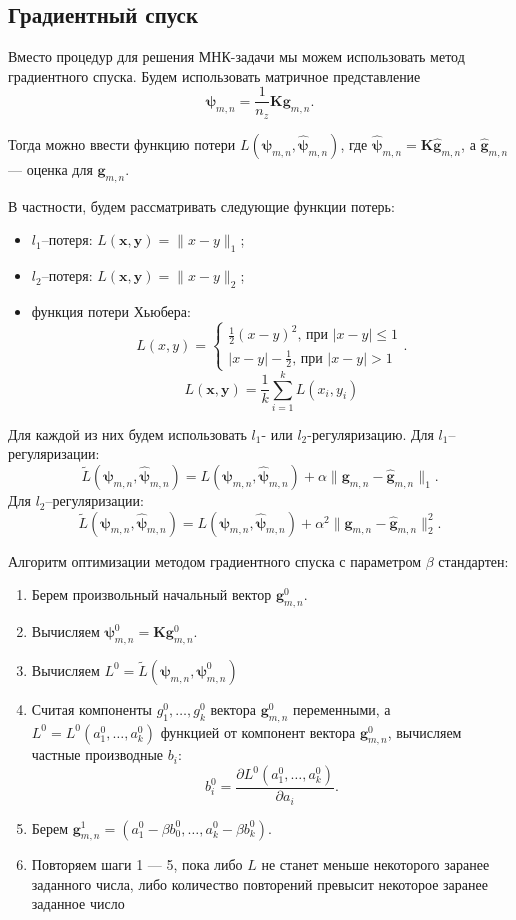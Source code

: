 \documentclass[../paper.tex]{subfiles}
\begin{document}
\subsection{Градиентный спуск}
Вместо процедур для решения МНК-задачи мы можем использовать метод градиентного
спуска. Будем использовать матричное представление
\[
	\bm{\psi}_{m,n} = \frac{1}{n_z} \bm{K} \bm{g}_{m,n}
.\]

Тогда можно ввести функцию потери $L(\bm{\psi}_{m,n}, \bm{\hat{\psi}}_{m,n})$,
где $\bm{\hat{\psi}}_{m,n} = \bm{K} \bm{\hat{g}}_{m,n}$, а $\bm{\hat{g}}_{m,n}$ ---
оценка для $\bm{g}_{m,n}$.

В частности, будем рассматривать следующие функции потерь:
\begin{itemize}
\item $l_1$--потеря: $L(\bm{x}, \bm{y}) = \| x - y \|_1$;
\item $l_2$--потеря: $L(\bm{x}, \bm{y}) = \| x - y \|_2$;
\item функция потери Хьюбера:
  \[
    L(x, y) =
    \begin{cases}
      \frac{1}{2} (x-y)^2 \text{, при $|x-y| \leqslant 1$} \\
      |x-y| - \frac{1}{2} \text{, при $|x-y| > 1$}
    \end{cases}.
  \]
  \[
    L(\bm{x}, \bm{y}) = \frac{1}{k} \sum_{i=1}^k L(x_i, y_i)
  \]
\end{itemize}

Для каждой из них будем использовать $l_1$- или $l_2$-регуляризацию. Для $l_1$--регуляризации:
\[
	\tilde{L}(\bm{\psi}_{m,n}, \bm{\hat{\psi}}_{m,n}) = L(\bm{\psi}_{m,n}, \bm{\hat{\psi}}_{m,n}) + \alpha \| \bm{g}_{m,n} - \bm{\hat{g}}_{m,n} \|_1
.\]
Для $l_2$--регуляризации:
\[
	\tilde{L}(\bm{\psi}_{m,n}, \bm{\hat{\psi}}_{m,n}) = L(\bm{\psi}_{m,n}, \bm{\hat{\psi}}_{m,n}) + \alpha^2 \| \bm{g}_{m,n} - \bm{\hat{g}}_{m,n} \|_2^2
.\]

Алгоритм оптимизации методом градиентного спуска с параметром $\beta$ стандартен:
\begin{enumerate}
	\item Берем произвольный начальный вектор $\bm{g}_{m,n}^0$.
	\item Вычисляем $\bm{\psi}_{m,n}^0 = \bm{K}\bm{g}_{m,n}^0$.
	\item Вычисляем $L^0 = \tilde{L}(\bm{\psi}_{m,n}, \bm{\psi}_{m,n}^0)$
	\item Считая компоненты $g_1^0, \dots, g_k^0$ вектора $\bm{g}_{m,n}^0$ переменными, 
		а $L^0 = L^0(a_1^0, \dots, a_k^0)$ функцией от компонент вектора $\bm{g}_{m,n}^0$, вычисляем частные производные $b_i$:
		\[
			b_i^0 = \frac{\partial L^0(a_1^0, \dots, a_k^0)}{\partial a_i}
		.\]
	\item Берем $\bm{g}_{m,n}^1 = (a_1^0 - \beta b_0^0, \dots, a_k^0 - \beta b_k^0)$.
	\item Повторяем шаги 1 --- 5, пока либо $L$ не станет меньше некоторого заранее заданного числа,
		либо количество повторений превысит некоторое заранее заданное число
\end{enumerate}
\end{document}
